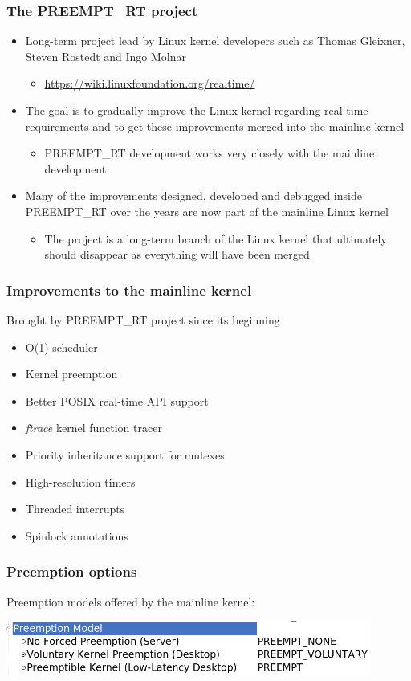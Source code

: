 \begin{frame}
  \frametitle{The PREEMPT\_RT project}
  \begin{itemize}
  \item Long-term project lead by Linux kernel developers
    such as Thomas Gleixner, Steven Rostedt and Ingo Molnar
    \begin{itemize}
    \item \url{https://wiki.linuxfoundation.org/realtime/}
    \end{itemize}
  \item The goal is to gradually improve the Linux kernel regarding
    real-time requirements and to get these improvements merged into
    the mainline kernel
    \begin{itemize}
    \item PREEMPT\_RT development works very closely with the mainline
      development
    \end{itemize}
  \item Many of the improvements designed, developed and debugged
    inside PREEMPT\_RT over the years are now part of the mainline
    Linux kernel
    \begin{itemize}
    \item The project is a long-term branch of the Linux kernel that
      ultimately should disappear as everything will have been merged
    \end{itemize}
  \end{itemize}
\end{frame}

\begin{frame}
  \frametitle{Improvements to the mainline kernel}
  Brought by PREEMPT\_RT project since its beginning
  \begin{itemize}
  \item O(1) scheduler
  \item Kernel preemption
  \item Better POSIX real-time API support
  \item {\em ftrace} kernel function tracer
  \item Priority inheritance support for mutexes
  \item High-resolution timers
  \item Threaded interrupts
  \item Spinlock annotations
  \end{itemize}
\end{frame}

\begin{frame}
  \frametitle{Preemption options}
  Preemption models offered by the mainline kernel:
  \begin{center}
    \includegraphics[width=0.9\textwidth]{slides/sysdev-realtime/kernel-config-preemption.png}
  \end{center}
\end{frame}

